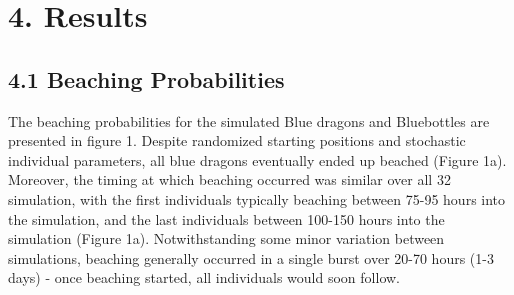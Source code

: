 \documentclass[
]{article}
\newenvironment{Shaded}{\begin{snugshade}}{\end{snugshade}}
\newcommand{\CommentTok}[1]{\textcolor[rgb]{0.56,0.35,0.01}{\textit{#1}}}
\newcommand{\FunctionTok}[1]{\textcolor[rgb]{0.00,0.00,0.00}{#1}}
\newcommand{\NormalTok}[1]{#1}
\newcommand{\OtherTok}[1]{\textcolor[rgb]{0.56,0.35,0.01}{#1}}
\newcommand{\SpecialCharTok}[1]{\textcolor[rgb]{0.00,0.00,0.00}{#1}}
\newcommand{\StringTok}[1]{\textcolor[rgb]{0.31,0.60,0.02}{#1}}
\begin{document}
\begin{Shaded}
\end{Shaded}

\hypertarget{results}{%
\section{4. Results}\label{results}}

\hypertarget{beaching-probabilities}{%
\subsection{4.1 Beaching Probabilities}\label{beaching-probabilities}}

The beaching probabilities for the simulated Blue dragons and
Bluebottles are presented in figure 1. Despite randomized starting
positions and stochastic individual parameters, all blue dragons
eventually ended up beached (Figure 1a). Moreover, the timing at which
beaching occurred was similar over all 32 simulation, with the first
individuals typically beaching between 75-95 hours into the simulation,
and the last individuals between 100-150 hours into the simulation
(Figure 1a). Notwithstanding some minor variation between simulations,
beaching generally occurred in a single burst over 20-70 hours (1-3
days) - once beaching started, all individuals would soon follow.
\end{document}
